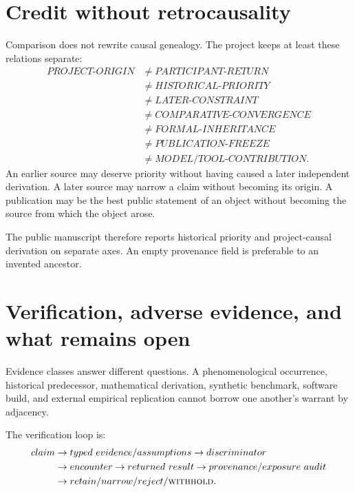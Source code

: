 \documentclass[11pt]{article}
\newcommand{\withhold}{\textsc{withhold}\xspace}
\begin{document}
\section{Credit without retrocausality}
\label{sec:credit}

Comparison does not rewrite causal genealogy. The project keeps at least these relations separate:
\begin{equation}
\begin{aligned}
PROJECT\text{-}ORIGIN&\neq PARTICIPANT\text{-}RETURN\\
&\neq HISTORICAL\text{-}PRIORITY\\
&\neq LATER\text{-}CONSTRAINT\\
&\neq COMPARATIVE\text{-}CONVERGENCE\\
&\neq FORMAL\text{-}INHERITANCE\\
&\neq PUBLICATION\text{-}FREEZE\\
&\neq MODEL/TOOL\text{-}CONTRIBUTION.
\end{aligned}
\end{equation}
An earlier source may deserve priority without having caused a later independent derivation. A later source may narrow a claim without becoming its origin. A publication may be the best public statement of an object without becoming the source from which the object arose.

The public manuscript therefore reports historical priority and project-causal derivation on separate axes. An empty provenance field is preferable to an invented ancestor.


\section{Verification, adverse evidence, and what remains open}
\label{sec:verification-expanded}

Evidence classes answer different questions. A phenomenological occurrence, historical predecessor, mathematical derivation, synthetic benchmark, software build, and external empirical replication cannot borrow one another's warrant by adjacency.

The verification loop is:
\begin{equation}
\begin{aligned}
claim
&\rightarrow typed\ evidence/assumptions
\rightarrow discriminator\\
&\rightarrow encounter
\rightarrow returned\ result
\rightarrow provenance/exposure\ audit\\
&\rightarrow retain/narrow/reject/\withhold.
\end{aligned}
\end{equation}
\end{document}
